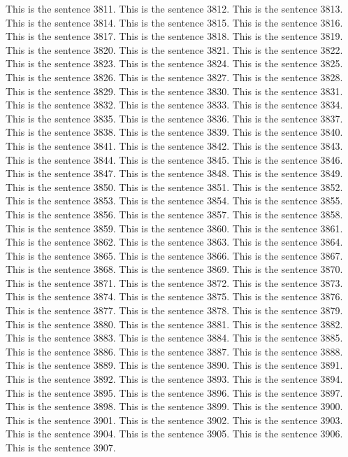 \documentclass{article}
\begin{document}
This is the sentence 3811.
This is the sentence 3812.
This is the sentence 3813.
This is the sentence 3814.
This is the sentence 3815.
This is the sentence 3816.
This is the sentence 3817.
This is the sentence 3818.
This is the sentence 3819.
This is the sentence 3820.
This is the sentence 3821.
This is the sentence 3822.
This is the sentence 3823.
This is the sentence 3824.
This is the sentence 3825.
This is the sentence 3826.
This is the sentence 3827.
This is the sentence 3828.
This is the sentence 3829.
This is the sentence 3830.
This is the sentence 3831.
This is the sentence 3832.
This is the sentence 3833.
This is the sentence 3834.
This is the sentence 3835.
This is the sentence 3836.
This is the sentence 3837.
This is the sentence 3838.
This is the sentence 3839.
This is the sentence 3840.
This is the sentence 3841.
This is the sentence 3842.
This is the sentence 3843.
This is the sentence 3844.
This is the sentence 3845.
This is the sentence 3846.
This is the sentence 3847.
This is the sentence 3848.
This is the sentence 3849.
This is the sentence 3850.
This is the sentence 3851.
This is the sentence 3852.
This is the sentence 3853.
This is the sentence 3854.
This is the sentence 3855.
This is the sentence 3856.
This is the sentence 3857.
This is the sentence 3858.
This is the sentence 3859.
This is the sentence 3860.
This is the sentence 3861.
This is the sentence 3862.
This is the sentence 3863.
This is the sentence 3864.
This is the sentence 3865.
This is the sentence 3866.
This is the sentence 3867.
This is the sentence 3868.
This is the sentence 3869.
This is the sentence 3870.
This is the sentence 3871.
This is the sentence 3872.
This is the sentence 3873.
This is the sentence 3874.
This is the sentence 3875.
This is the sentence 3876.
This is the sentence 3877.
This is the sentence 3878.
This is the sentence 3879.
This is the sentence 3880.
This is the sentence 3881.
This is the sentence 3882.
This is the sentence 3883.
This is the sentence 3884.
This is the sentence 3885.
This is the sentence 3886.
This is the sentence 3887.
This is the sentence 3888.
This is the sentence 3889.
This is the sentence 3890.
This is the sentence 3891.
This is the sentence 3892.
This is the sentence 3893.
This is the sentence 3894.
This is the sentence 3895.
This is the sentence 3896.
This is the sentence 3897.
This is the sentence 3898.
This is the sentence 3899.
This is the sentence 3900.
This is the sentence 3901.
This is the sentence 3902.
This is the sentence 3903.
This is the sentence 3904.
This is the sentence 3905.
This is the sentence 3906.
This is the sentence 3907.
\end{document}
